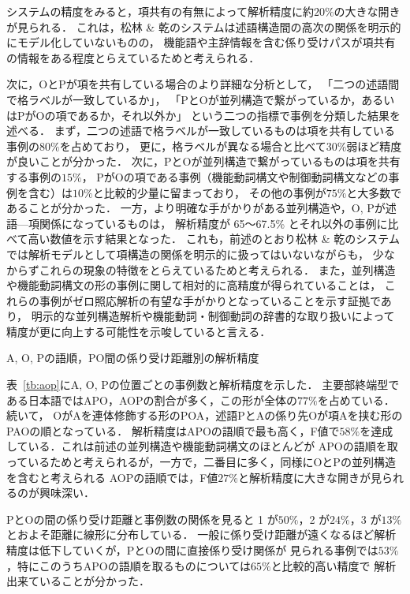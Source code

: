 \documentclass[japanese]{jnlp_1.4}
\begin{document}
システムの精度をみると，項共有の有無によって解析精度に約$20\%$の大きな開きが見られる．
これは，松林 \& 乾のシステムは述語構造間の高次の関係を明示的にモデル化していないものの，
機能語や主辞情報を含む係り受けパスが項共有の情報をある程度とらえているためと考えられる．

次に，OとPが項を共有している場合のより詳細な分析として，
「二つの述語間で格ラベルが一致しているか」，
「PとOが並列構造で繋がっているか，あるいはPがOの項であるか，それ以外か」
という二つの指標で事例を分類した結果を述べる．
まず，二つの述語で格ラベルが一致しているものは項を共有している事例の$80\%$を占めており，
更に，格ラベルが異なる場合と比べて$30\%$弱ほど精度が良いことが分かった．
次に，PとOが並列構造で繋がっているものは項を共有する事例の$15\%$，
PがOの項である事例（機能動詞構文や制御動詞構文などの事例を含む）は$10\%$と比較的少量に留まっており，
その他の事例が$75\%$と大多数であることが分かった．
一方，より明確な手がかりがある並列構造や，O, Pが述語—項関係になっているものは，
解析精度が 65〜67.5\% とそれ以外の事例に比べて高い数値を示す結果となった．
これも，前述のとおり松林 \& 乾のシステムでは解析モデルとして項構造の関係を明示的に扱ってはいないながらも，
少なからずこれらの現象の特徴をとらえているためと考えられる．
また，並列構造や機能動詞構文の形の事例に関して相対的に高精度が得られていることは，
これらの事例がゼロ照応解析の有望な手がかりとなっていることを示す証拠であり，
明示的な並列構造解析や機能動詞・制御動詞の辞書的な取り扱いによって精度が更に向上する可能性を示唆していると言える．

\begin{table}[b]
\vspace{-0.5\Cvs}
\caption{A, O, Pの語順，PO間の係り受け距離別の解析精度}
\label{tb:aop}

\end{table}

表~\ref{tb:aop}にA, O, Pの位置ごとの事例数と解析精度を示した．
主要部終端型である日本語ではAPO，AOPの割合が多く，この形が全体の$77\%$を占めている．続いて，
OがAを連体修飾する形のPOA，述語PとAの係り先Oが項Aを挟む形のPAOの順となっている．
解析精度はAPOの語順で最も高く，F値で$58\%$を達成している．これは前述の並列構造や機能動詞構文のほとんどが
APOの語順を取っているためと考えられるが，一方で，二番目に多く，同様にOとPの並列構造を含むと考えられる
AOPの語順では，F値$27\%$と解析精度に大きな開きが見られるのが興味深い．

PとOの間の係り受け距離と事例数の関係を見ると 1 が$50\%$，2 が$24\%$，3 が$13\%$とおよそ距離に線形に分布している．
一般に係り受け距離が遠くなるほど解析精度は低下していくが，PとOの間に直接係り受け関係が
見られる事例では$53\%$，特にこのうちAPOの語順を取るものについては$65\%$と比較的高い精度で
解析出来ていることが分かった．
\end{document}
